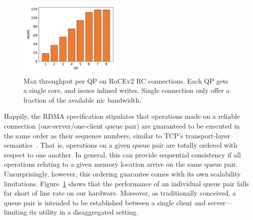 
\begin{figure}[t] \includegraphics[width=0.45\textwidth]{fig/qp_bottleneck.pdf}

\caption{Max throughput per QP on RoCEv2 RC connections. Each QP gets a single
core, and issues inlined writes. Single connection only offer a fraction of the
available nic bandwidth.} 

\label{fig:qp_bottleneck} \end{figure}

Happily, the RDMA specification stipulates that operations made on a
reliable connection (one-server/one-client queue pair) are guaranteed
to be executed in the same order as their sequence numbers, similar to
TCP's transport-layer semantics~\cite{infiniband-spec}.
That is, operations on a given queue pair
are totally ordered with respect to one another.
In general, this can provide sequential consistency if
all operations relating to a given memory location arrive on the same
queue pair.  Unsurprisingly, however, this ordering guarantee comes
with its own scalability limitations.  Figure~\ref{fig:qp_bottleneck}
shows that the performance of an individual queue pair falls far short
of line rate on our hardware.  Moreover, as traditionally conceived, a
queue pair is intended to be established between a single client and
server---limiting its utility in a disaggregated setting.


